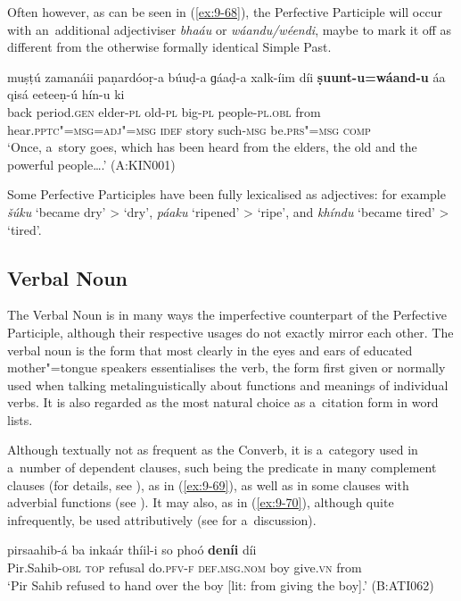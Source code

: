 Often however, as can be seen in (\ref{ex:9-68}), the Perfective Participle will occur with an~additional adjectiviser \textit{bhaáu} or \textit{wáandu/wéendi}, maybe to mark it off as different from the otherwise formally identical Simple Past.

\ea
\label{ex:9-68}
\gll muṣṭú zamanáii paṇardóoṛ-a búuḍ-a ɡáaḍ-a xalk-íim díi \textbf{ṣuunt-u=wáand-u} áa qisá eeteeṇ-ú hín-u ki\\
back period.\textsc{gen} elder-\textsc{pl} old-\textsc{pl} big-\textsc{pl}  people-\textsc{pl.obl} from hear.\textsc{pptc"=msg=adj"=msg} \textsc{idef} story such-\textsc{msg} be.\textsc{prs"=msg} \textsc{comp} \\
\glt `Once, a~story goes, which has been heard from the elders, the old and the powerful people{\ldots}.'
(A:KIN001)
\z

Some Perfective Participles have been fully lexicalised as adjectives: for example \textit{šúku} `became dry' {\textgreater} `dry', \textit{páaku} `ripened' {\textgreater} `ripe', and \textit{khíndu} `became tired' {\textgreater} `tired'.


\subsection{Verbal Noun}
\label{subsec:9-3-3}


The Verbal Noun is in many ways the imperfective counterpart of the Perfective Participle, although their respective usages do not exactly mirror each other. The verbal noun is the form that most clearly in the eyes and ears of educated mother"=tongue speakers essentialises the verb, the form first given or normally used when talking metalinguistically about functions and meanings of individual verbs. It is also regarded as the most natural choice as a~citation form in word lists. 


Although textually not as frequent as the Converb, it is a~category used in a~number of dependent clauses, such being the predicate in many complement clauses (for details, see ), as in (\ref{ex:9-69}), as well as in some clauses with adverbial functions (see ). It may also, as in (\ref{ex:9-70}), although quite infrequently, be used attributively (see  for a~discussion).

\begin{exe}
\ex
\label{ex:9-69}
\gll pirsaahib-á ba inkaár thíil-i so phoó \textbf{deníi} díi \\
Pir.Sahib-\textsc{obl} \textsc{top} refusal do.\textsc{pfv-f} \textsc{def.msg.nom} boy give.\textsc{vn} from \\
\glt `Pir Sahib refused to hand over the boy [lit: from giving the boy].' (B:ATI062)
\end{exe}

